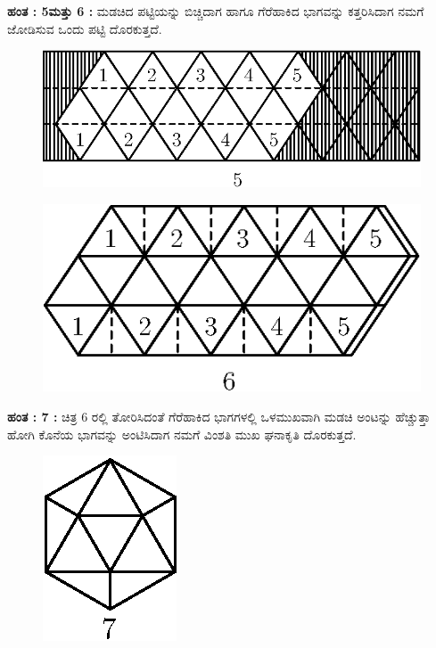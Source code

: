 \begin{enumerate}
 \textbf{ಹಂತ : 5ಮತ್ತು 6 :} ಮಡಚಿದ ಪಟ್ಟಿಯನ್ನು ಬಿಚ್ಚಿದಾಗ ಹಾಗೂ ಗೆರೆಹಾಕಿದ ಭಾಗವನ್ನು ಕತ್ತರಿಸಿದಾಗ ನಮಗೆ ಜೋಡಿಸುವ ಒಂದು ಪಟ್ಟಿ ದೊರಕುತ್ತದೆ. 
 \begin{figure}[H]
\centering
\includegraphics[scale=.98]{src/figure/chap1/fig1-22c.eps}
\end{figure}
\begin{figure}[H]
\centering
\includegraphics[scale=.98]{src/figure/chap1/fig1-22d.eps}
\end{figure}
 
 \textbf{ಹಂತ : 7 : } ಚಿತ್ರ 6 ರಲ್ಲಿ ತೋರಿಸಿದಂತೆ ಗೆರೆಹಾಕಿದ ಭಾಗಗಳಲ್ಲಿ ಒಳಮುಖವಾಗಿ ಮಡಚಿ ಅಂಟನ್ನು ಹೆಚ್ಚುತ್ತಾ ಹೋಗಿ ಕೊನೆಯ ಭಾಗವನ್ನು ಅಂಟಿಸಿದಾಗ ನಮಗೆ ವಿಂಶತಿ ಮುಖ ಘನಾಕೃತಿ ದೊರಕುತ್ತದೆ.  
 \begin{figure}[H]
\centering
\includegraphics[scale=.98]{src/figure/chap1/fig1-22e.eps}
\end{figure}
 
 \end{enumerate}
 
